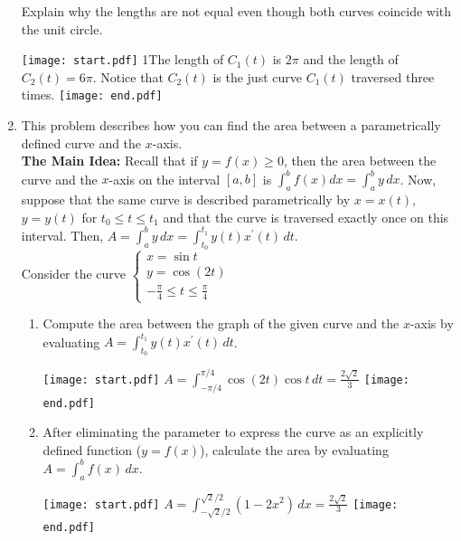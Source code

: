 \documentclass[12pt]{article}
\begin{document}
\begin{enumerate}
Explain why the lengths are not equal even though both curves coincide with the unit circle.

\texttt{[image: start.pdf]}
{{{1\linewidth}{The length of $C_1(t)$ is $2\pi$ and the length of $C_2(t)=6\pi$.  Notice that $C_2(t)$ is the just curve $C_1(t)$ traversed three times.}}}
\texttt{[image: end.pdf]}


\item This problem describes how you can find the area between a parametrically defined curve and the $x$-axis.\\

{\bf The Main Idea:} Recall that if $y=f(x)\geq 0$, then the area between the curve and the $x$-axis on the interval $[a,b]$ is $\int_a^b f(x)dx=\int_a^b y\,dx$.  Now, suppose that the same curve is described parametrically by $x=x(t)$, $y=y(t)$ for $t_0 \leq t \leq t_1$ and that the curve is traversed exactly once on this interval.  Then, $A=\int_a^b y\,dx=\int_{t_0}^{t_1} y(t)x^{\prime}(t)\,dt$.  \\

Consider the curve $\left\{\begin{array}{l}
x=\sin{t}\\
y=\cos{(2t)}\\
-\frac{\pi}{4} \leq t \leq \frac{\pi}{4} \end{array} \right.$

\begin{enumerate}

\item Compute the area between the graph of the given curve and the $x$-axis by evaluating $A=\int_{t_0}^{t_1} y(t)x^{\prime}(t) \,dt$.

\texttt{[image: start.pdf]}
{{$A=\int_{-\pi/4}^{\pi/4} \cos{(2t)} \cos{t}\,dt=\frac{2\sqrt{2}}{3}$}}
\texttt{[image: end.pdf]}


\item After eliminating the parameter to express the curve as an explicitly defined function ($y=f(x)$), calculate the area by evaluating $A=\int_a^b f(x) \,dx$.

\texttt{[image: start.pdf]}
{{$A=\int_{-\sqrt{2}/2}^{\sqrt{2}/2} \left(1-2x^2\right) \,dx=\frac{2\sqrt{2}}{3}$}}
\texttt{[image: end.pdf]}


\end{enumerate}

\end{enumerate}
\end{document}
